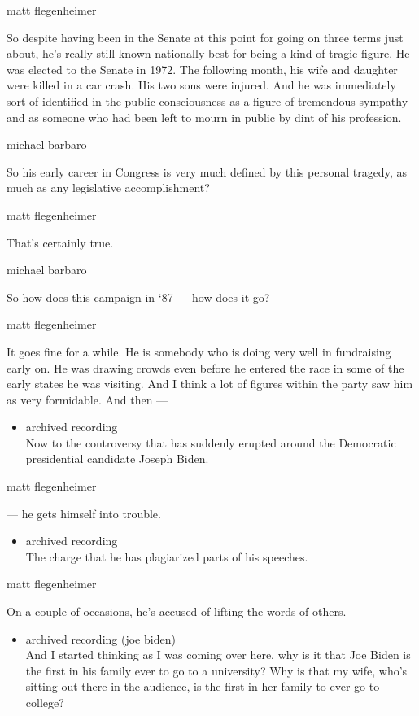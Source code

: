 matt flegenheimer

So despite having been in the Senate at this point for going on three
terms just about, he's really still known nationally best for being a
kind of tragic figure. He was elected to the Senate in 1972. The
following month, his wife and daughter were killed in a car crash. His
two sons were injured. And he was immediately sort of identified in the
public consciousness as a figure of tremendous sympathy and as someone
who had been left to mourn in public by dint of his profession.

michael barbaro

So his early career in Congress is very much defined by this personal
tragedy, as much as any legislative accomplishment?

matt flegenheimer

That's certainly true.

michael barbaro

So how does this campaign in `87 --- how does it go?

matt flegenheimer

It goes fine for a while. He is somebody who is doing very well in
fundraising early on. He was drawing crowds even before he entered the
race in some of the early states he was visiting. And I think a lot of
figures within the party saw him as very formidable. And then ---

\begin{itemize}
\tightlist
\item
  archived recording\\
  Now to the controversy that has suddenly erupted around the Democratic
  presidential candidate Joseph Biden.
\end{itemize}

matt flegenheimer

--- he gets himself into trouble.

\begin{itemize}
\tightlist
\item
  archived recording\\
  The charge that he has plagiarized parts of his speeches.
\end{itemize}

matt flegenheimer

On a couple of occasions, he's accused of lifting the words of others.

\begin{itemize}
\tightlist
\item
  archived recording (joe biden)\\
  And I started thinking as I was coming over here, why is it that Joe
  Biden is the first in his family ever to go to a university? Why is
  that my wife, who's sitting out there in the audience, is the first in
  her family to ever go to college?
\end{itemize}

